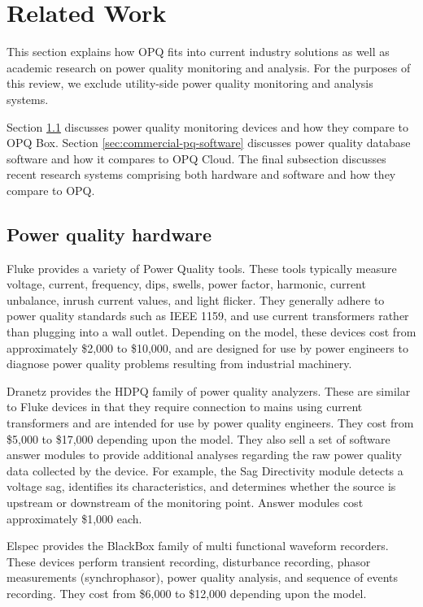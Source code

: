 \section{Related Work}
\label{sec:related-work}

This section explains how OPQ fits into current industry solutions as well as academic research on power quality monitoring and analysis. For the purposes of this review, we exclude utility-side power quality monitoring and analysis systems.

Section \ref{sec:commercial-pq-devices} discusses power quality monitoring devices and how they compare to OPQ Box. Section \ref{sec:commercial-pq-software} discusses power quality database software and how it compares to OPQ Cloud. The final subsection discusses recent research systems comprising both hardware and software and how they compare to OPQ.

\subsection{Power quality hardware}
\label{sec:commercial-pq-devices}

Fluke \cite{fluke_fluke_2020} provides a variety of Power Quality tools. These tools typically measure voltage, current, frequency, dips, swells, power factor, harmonic, current unbalance, inrush current values, and light flicker. They generally adhere to power quality standards such as IEEE 1159, and use current transformers rather than plugging into a wall outlet. Depending on the model, these devices cost from approximately \$2,000 to \$10,000, and are designed for use by power engineers to diagnose power quality problems resulting from industrial machinery.

Dranetz \cite{dranetz_dranetz_2020} provides the HDPQ family of power quality analyzers. These are similar to Fluke devices in that they require connection to mains using current transformers and are intended for use by power quality engineers. They cost from \$5,000 to \$17,000 depending upon the model. They also sell a set of software answer modules to provide additional analyses regarding the raw power quality data collected by the device. For example, the Sag Directivity module detects a voltage sag, identifies its characteristics, and determines whether the source is upstream or downstream of the monitoring point. Answer modules cost approximately \$1,000 each.

Elspec \cite{elspec_elspec_2020} provides the BlackBox family of multi functional waveform recorders. These devices perform transient recording, disturbance recording, phasor measurements (synchrophasor), power quality analysis, and sequence of events recording. They cost from \$6,000 to \$12,000 depending upon the model.


